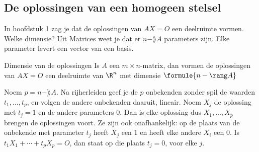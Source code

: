 
\subsection{De oplossingen van een homogeen stelsel}

In hoofdstuk 1 zag je dat de oplossingen van $AX = O$ een deelruimte vormen. Welke dimensie? Uit Matrices weet je dat er $n - \rang A$ parameters zijn. Elke parameter levert een vector van een basis.

\begin{theorie}
\begin{stelling}{Dimensie van de oplossingen}
Is $A$ een $m \times n$-matrix, dan vormen de oplossingen van $AX = O$ een deelruimte van $\R^n$ met dimensie $\formule{n - \rang A}$
\end{stelling}

\begin{bewijs}
Noem $p = n - \rang A$. Na rijherleiden geef je de $p$ onbekenden zonder spil de waarden $t_1, \ldots, t_p$, en volgen de andere onbekenden daaruit, lineair. Noem $X_j$ de oplossing met $t_j = 1$ en de andere parameters 0. Dan is elke oplossing
dus $X_1, \ldots, X_p$ brengen de oplossingen voort. Ze zijn ook onafhankelijk: op de plaats van de onbekende met parameter $t_j$ heeft $X_j$ een 1 en heeft elke andere $X_i$ een 0. Is $t_1X_1 + \cdots + t_pX_p = O$, dan staat op die plaats $t_j = 0$, voor elke $j$.
\end{bewijs}
\end{theorie}

